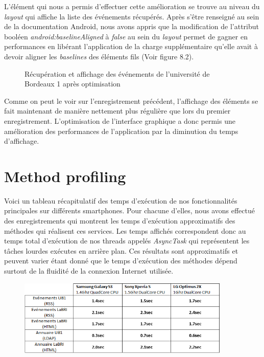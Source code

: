 L'élément qui nous a permis d'effectuer cette amélioration se trouve au niveau du \textit{layout} qui affiche la liste des événements récupérés. Après s'être renseigné au sein de la documentation Android, nous avons appris que la  modification de l'attribut booléen \textit{android:baselineAligned} à \textit{false} au sein du \textit{layout} permet de gagner en performances en libérant l'application de la charge supplémentaire qu'elle avait à devoir aligner les \textit{baselines} des éléments fils (Voir figure 8.2).

\begin{figure}[h!]
  \label{fig:systrace_optim}
  \center
  \setlength\fboxsep{5pt}
  \setlength\fboxrule{0.5pt}
  \caption{Récupération et affichage des événements de l'université de Bordeaux 1 après optimisation}
\end{figure}

Comme on peut le voir sur l'enregistrement précédent, l'affichage des éléments se fait maintenant de manière nettement plus régulière que lors du premier enregistrement. L'optimisation de l'interface graphique a donc permis une amélioration des performances de l'application par la diminution du temps d'affichage.

\section{Method profiling}
Voici un tableau récapitulatif des temps d’exécution de nos fonctionnalités principales sur différents smartphones. Pour chacune d'elles, nous avons effectué des enregistrements qui montrent les temps d'exécution approximatifs des méthodes qui réalisent ces services. Les temps affichés correspondent donc au temps total d'exécution de nos threads appelés \textit{AsyncTask} qui représentent les tâches lourdes exécutes en arrière plan. Ces résultats sont approximatifs et peuvent varier étant donné que le temps d’exécution des méthodes dépend surtout de la fluidité de la connexion Internet utilisée.\\

\begin{figure}[h!]
  \label{fig:benchmark}
  \center
  \includegraphics[width=0.9\textwidth]{resources/benchmark.png}
\end{figure}

